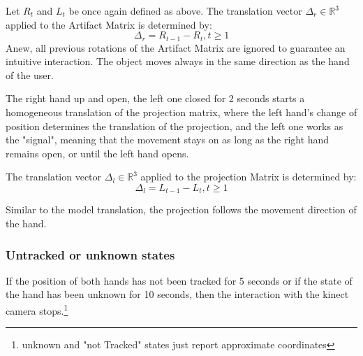 \documentclass[12pt]{extarticle}
\newcommand{\R}{\mathbb{R}}
\begin{document}
\begin{appendices}
Let $R_t$ and $L_t$ be once again defined as above. The translation vector $\Delta_r\in \R^3$ applied to the Artifact Matrix is determined by:
$$\Delta_r=R_{t-1}-R_t, t\geq 1$$
Anew, all previous rotations of the Artifact Matrix are ignored to guarantee an intuitive interaction. The object moves always in the same direction as the hand of the user.

The right hand up and open, the left one closed for 2 seconds starts a homogeneous translation of the projection matrix, where the left hand's change of position determines the translation of the projection, and the left one works as the "signal", meaning that the movement stays on as long as the right hand remains open, or until the left hand opens.

The translation vector $\Delta_l\in \R^3$ applied to the projection Matrix is determined by:
$$\Delta_l=L_{t-1}-L_t, t\geq 1$$

Similar to the model translation, the projection follows the movement direction of the hand.
\subsubsection {Untracked or unknown states} If the position of both hands has not been tracked for 5 seconds or if the state of the hand has been unknown for 10 seconds, then the interaction with the kinect camera stops.\footnote{unknown and "not Tracked" states just report approximate coordinates} 


\end{appendices}
\end{document}
